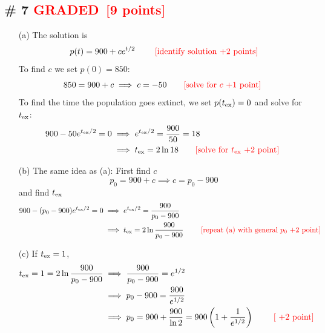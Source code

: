 \documentclass[12pt,letterpaper]{exam}
\newcommand{\grade}{\textcolor{red}{GRADED}}
\newcommand{\pts}[1]{\textcolor{red}{[#1]}}
\begin{document}
\subsection*{\# 7 \grade \, \pts{9 points}}
\begin{enumerate}
\item[(a)] The solution is 
\begin{equation}
p(t) = 900 + ce^{t/2} \quad\quad \text{ \pts{identify solution +2 points}}
\end{equation}
To find $c$ we set $p(0) = 850$: 
\begin{equation}
850 = 900 + c \implies c = -50 \quad\quad \text{\pts{solve for $c$ +1 point} }
\end{equation}
To find the time the population goes extinct, we set $p(t_{\rm ex}) = 0$ and solve for $t_{\rm ex}$: 
\begin{align}
900 -50 e^{t_{\rm ex}/2} =0 &\implies e^{t_{\rm ex}/2}  = \frac{900}{50} =18\\
&\implies t_{\rm ex} = 2 \ln18  \quad\quad \text{\pts{solve for $t_{\rm ex}$ +2 point} }
\end{align}
\item[(b)] The same idea as (a): First find $c$
\begin{equation}
p_0 = 900 + c \implies c = p_0-900
\end{equation}
and find $t_{\rm ex}$
\begin{align}
900 -(p_0-900) e^{t_{\rm ex}/2} =0 &\implies e^{t_{\rm ex}/2}  = \frac{900}{p_0-900}\\
&\implies t_{\rm ex} = 2 \ln\frac{900}{p_0-900} \quad\quad \text{ \pts{repeat (a) with general $p_0$  +2 point} }
\end{align}
\item[(c)]  If $t_{\rm ex} = 1$, 
\begin{align}
t_{\rm ex}  =1= 2 \ln\frac{900}{p_0-900}&\implies  \frac{900}{p_0-900} =e^{1/2}\\
&\implies p_0-900 = \frac{900}{e^{1/2}} \\
&\implies p_0 =   900 + \frac{900}{\ln 2} = 900\left(1+ \frac{1}{e^{1/2}} \right) \quad \text{ \quad \text{\pts{ +2 point}}}
\end{align}

\end{enumerate}


\end{document}
